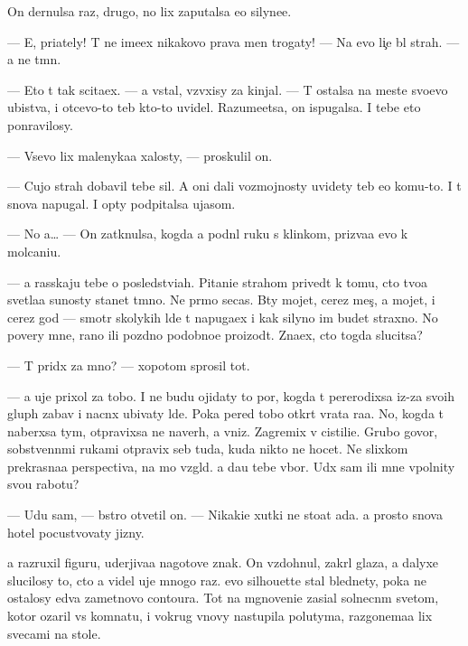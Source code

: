 \documentclass[10pt]{book}
\begin{document}
On dernulsa raz, drugo{\y}, no lix zaputalsa {\y}e{\x}o silyne{\y}e.

— E{\y}, pri{\y}ately! T{\yi} ne ime{\y}ex nikakovo prava men{\ia} trogaty! — Na {\y}evo li{\c}e b{\yi}l strah. — {\Y}a ne t{\e}mn{\yi}{\y}.

— Eto t{\yi} tak scita{\y}ex. — {\Y}a vstal, vz{\ia}vxisy za kinjal. — T{\yi} ostalsa na meste svo{\y}evo ubi{\y}stva, i otcevo-to teb{\ia} kto-to uvidel. Razume{\y}etsa, on ispugalsa. I tebe eto ponravilosy.

— Vsevo lix malenyka{\y}a xalosty, — proskulil on.

— Cujo{\y} strah dobavil tebe sil. A oni dali vozmojnosty uvidety teb{\ia} {\y}e{\x}o komu-to. I t{\yi} snova napugal. I op{\ia}ty podpitalsa ujasom.

— No {\y}a… — On zatknulsa, kogda {\y}a podn{\ia}l ruku s klinkom, priz{\yi}va{\y}a {\y}evo k molcani{\y}u.

— {\Y}a rasskaju tebe o posledstvi{\y}ah. Pitani{\y}e strahom prived{\e}t k tomu, cto tvo{\y}a svetla{\y}a su{\x}nosty stanet t{\e}mno{\y}. Ne pr{\ia}mo se{\y}cas. B{\yi}ty mojet, cerez mes{\ia}{\c}, a mojet, i cerez god — smotr{\ia} skolykih l{\io}de{\y} t{\yi} napuga{\y}ex i kak silyno im budet straxno. No povery mne, rano ili pozdno podobno{\y}e proizo{\y}d{\e}t. Zna{\y}ex, cto togda slucitsa?

— T{\yi} prid{\e}x za mno{\y}? — xopotom sprosil tot.

— {\Y}a uje prixol za tobo{\y}. I ne budu ojidaty to{\y} por{\yi}, kogda t{\yi} pererodixsa iz-za svo{\y}ih glup{\yi}h zabav i nacn{\e}x ubivaty l{\io}de{\y}. Poka pered tobo{\y} otkr{\yi}t{\yi} vrata ra{\y}a. No, kogda t{\yi} naber{\e}xsa tym{\yi}, otpravixsa ne naverh, a vniz. Zagremix v cistili{\x}e. Grubo govor{\ia}, sobstvenn{\yi}mi rukami otpravix seb{\ia} tuda, kuda nikto ne hocet. Ne slixkom prekrasna{\y}a perspectiva, na mo{\y} vzgl{\ia}d. {\Y}a da{\y}u tebe v{\yi}bor. U{\y}d{\e}x sam ili mne v{\yi}polnity svo{\y}u rabotu?

— U{\y}du sam, — b{\yi}stro otvetil on. — Nikaki{\y}e xutki ne sto{\y}at ada. {\Y}a prosto snova hotel pocustvovaty jizny.

{\Y}a razruxil figuru, uderjiva{\y}a nagotove znak. On vzdohnul, zakr{\yi}l glaza, a dalyxe slucilosy to, cto {\y}a videl uje mnogo raz. {\Y}evo silhouette stal blednety, poka ne ostalosy {\y}edva zametnovo contoura. Tot na mgnoveni{\y}e zasi{\y}al solnecn{\yi}m svetom, kotor{\yi}{\y} ozaril vs{\io} komnatu, i vokrug vnovy nastupila polutyma, razgon{\ia}{\y}ema{\y}a lix svecami na stole.
\end{document}
